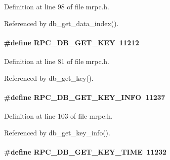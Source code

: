 Definition at line 98 of file mrpc.h.

Referenced by db\_\-get\_\-data\_\-index().
\paragraph[{RPC\_\-DB\_\-GET\_\-KEY}]{\setlength{\rightskip}{0pt plus 5cm}\#define RPC\_\-DB\_\-GET\_\-KEY~11212}\hfill\label{group__mrpcdefineh_ga87d034e95f02df59e78f7a1b40101ba9}

\begin{DoxyItemize}
\item 
\end{DoxyItemize}

Definition at line 81 of file mrpc.h.

Referenced by db\_\-get\_\-key().
\paragraph[{RPC\_\-DB\_\-GET\_\-KEY\_\-INFO}]{\setlength{\rightskip}{0pt plus 5cm}\#define RPC\_\-DB\_\-GET\_\-KEY\_\-INFO~11237}\hfill\label{group__mrpcdefineh_gabcf7f2678a2ee27a0c9d58d9246d2ed0}

\begin{DoxyItemize}
\item 
\end{DoxyItemize}

Definition at line 103 of file mrpc.h.

Referenced by db\_\-get\_\-key\_\-info().
\paragraph[{RPC\_\-DB\_\-GET\_\-KEY\_\-TIME}]{\setlength{\rightskip}{0pt plus 5cm}\#define RPC\_\-DB\_\-GET\_\-KEY\_\-TIME~11232}\hfill\label{group__mrpcdefineh_gae639d2fe4b40ca265f5160e1e5b091f7}

\begin{DoxyItemize}
\item 
\end{DoxyItemize}

